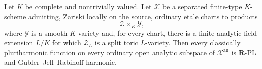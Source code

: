 
\begin{corollary}
\label{cor:p061-v3-zariski-etale-finite-split-toric-charts}
Let \(K\) be complete and nontrivially valued.  Let \(\mathcal X\) be a
separated finite-type \(K\)-scheme admitting, Zariski locally on the
source, ordinary etale charts to products
\[
                         \mathcal Z\times_K\mathcal Y,
\]
where \(\mathcal Y\) is a smooth \(K\)-variety and, for every chart, there
is a finite analytic field extension \(L/K\) for which
\(\mathcal Z_L\) is a split toric \(L\)-variety.  Then every classically
pluriharmonic function on every ordinary open analytic subspace of
\(\mathcal X^{\mathrm{an}}\) is \(\mathbf R\)-PL and
Gubler--Jell--Rabinoff harmonic.
\end{corollary}
